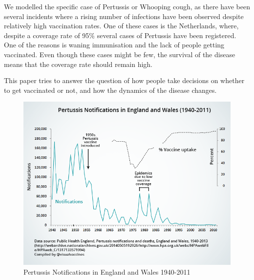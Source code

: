 \documentclass[11pt]{article}
\begin{document}
\vspace{14px}

We modelled the specific case of Pertussis or Whooping cough, as there have been several incidents where a rising number of infections have been observed despite relatively high vaccination rates. One of these cases is the Netherlands, where, despite a coverage rate of 95\% several cases of Pertussis have been registered. One of the reasons is waning immunisation and the lack of people getting vaccinated. Even though these cases might be few, the survival of the disease means that the coverage rate should remain high. 

This paper tries to answer the question of how people take decisions on whether to get vaccinated or not, and how the dynamics of the disease changes. 

\begin{figure}
\centering
\begin{minipage}{.6\textwidth}
  \centering
  \includegraphics[height=0.7\linewidth]{ukpertussis}
  \caption{Pertussis Notifications in England \break
  and Wales 1940-2011}  
  \label{fig:1}
  

\end{minipage}
\end{figure}
\end{document}
